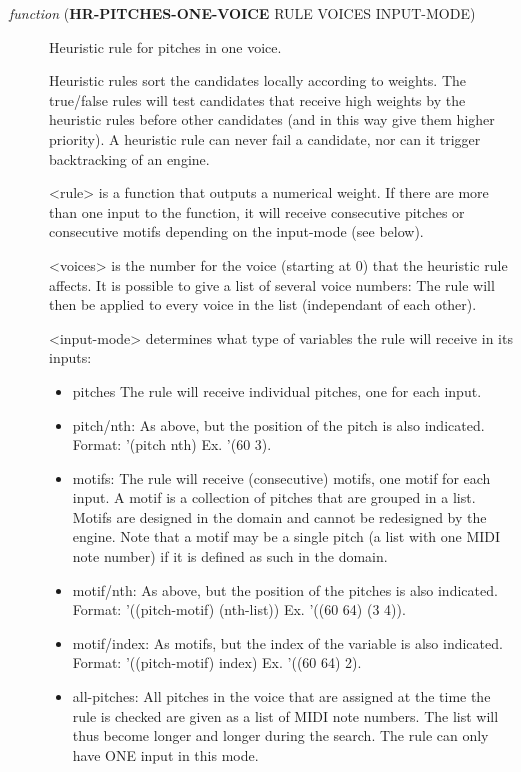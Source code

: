 \begin{description}
\item[{ \emph{function} (\textbf{HR-PITCHES-ONE-VOICE} RULE VOICES INPUT-MODE)}] Heuristic rule for pitches in one voice.

Heuristic rules sort the candidates locally according to weights. 
The true/false rules will test candidates that receive high weights by
the heuristic rules before other candidates (and in this way give them
higher priority). A heuristic rule can never fail a candidate, nor 
can it trigger backtracking of an engine. 

<rule> is a function that outputs a numerical weight. If there are more 
than one input to the function, it will receive consecutive pitches 
or consecutive motifs depending on the input-mode (see below). 

<voices> is the number for the voice (starting at 0) that the heuristic 
rule affects. It is possible to give a list of several voice numbers: 
The rule will then be applied to every voice in the list (independant 
of each other).

<input-mode> determines what type of variables the rule will receive in 
its inputs:
\begin{itemize}
\item pitches The rule will receive individual  pitches, one for each input.
\item pitch/nth: As above, but the position of the pitch is also indicated.
Format: '(pitch nth) Ex. '(60 3).
\item motifs: The rule will receive (consecutive) motifs, one motif for each 
input. A motif is a collection of pitches that are grouped in 
a list. Motifs are designed in the domain and cannot be redesigned
by the engine. Note that a motif may be a single pitch (a list 
with one MIDI note number) if it is defined as such in the domain.
\item motif/nth: As above, but the position of the pitches is also indicated.
Format: '((pitch-motif) (nth-list)) Ex. '((60 64) (3 4)).
\item motif/index: As motifs, but the index of the variable is also indicated.
Format: '((pitch-motif) index) Ex. '((60 64) 2).
\item all-pitches: All pitches in the voice that are assigned at the time the  
rule is checked are given as a list of MIDI note numbers.  
The list will thus become longer and longer during the 
search. The rule can only have ONE input in this mode.
\end{itemize}
\end{description}



